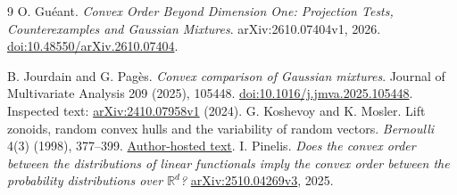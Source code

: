 \documentclass[11pt]{article}
\begin{document}
\begin{thebibliography}{9}
 O. Gu\'eant.
\emph{Convex Order Beyond Dimension One: Projection Tests, Counterexamples and Gaussian Mixtures}.
arXiv:2610.07404v1, 2026.
\href{https://doi.org/10.48550/arXiv.2610.07404}{doi:10.48550/arXiv.2610.07404}.

 B. Jourdain and G. Pag\`es.
\emph{Convex comparison of Gaussian mixtures}.
Journal of Multivariate Analysis 209 (2025), 105448.
\href{https://doi.org/10.1016/j.jmva.2025.105448}{doi:10.1016/j.jmva.2025.105448}.
Inspected text: \href{https://arxiv.org/abs/2410.07958v1}{arXiv:2410.07958v1} (2024).
 G. Koshevoy and K. Mosler.
Lift zonoids, random convex hulls and the variability of random vectors.
\emph{Bernoulli} 4(3) (1998), 377--399.
\href{https://wisostat.uni-koeln.de/sites/dep_econometrics/pdf_publikationen/1998_KoshevoyM98.pdf}{Author-hosted text}.
 I. Pinelis.
\emph{Does the convex order between the distributions of linear functionals imply the convex order between the probability distributions over $\mathbb R^d$?}
\href{https://arxiv.org/abs/2510.04269v3}{arXiv:2510.04269v3}, 2025.
\end{thebibliography}
\end{document}
